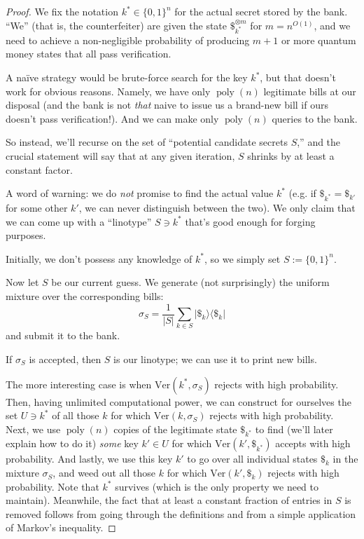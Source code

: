 \documentclass[12pt]{report}
\theoremstyle{plain}
\theoremstyle{definition}
\newcommand{\poly}{\operatorname{poly}}
\newcommand{\ketbra}[2]{|#1\rangle\!\langle#2|}
\newcommand{\proj}[1]{\ketbra{#1}{#1}}
\begin{document}
\begin{proof}
We fix the notation $k^\ast\in\{0,1\}^n$ for the actual secret stored by the bank.  ``We'' (that is, the counterfeiter) are given the state $\$_{k^\ast}^{\otimes m}$ for $m=n^{O(1)}$, and we need to achieve a non-negligible probability of producing $m+1$ or more quantum money states that all pass verification.

A na\"{i}ve strategy would be brute-force search for the key $k^\ast$, but that doesn't work for obvious reasons.  Namely, we have only $\poly(n)$ legitimate bills at our disposal (and the bank is not {\em that} naive to issue us a brand-new bill if ours doesn't pass verification!). And we can make only $\poly(n)$ queries to the bank.

So instead, we'll recurse on the set of ``potential candidate secrets $S$,'' and the crucial statement will say that at any given iteration, $S$ shrinks by at least a constant factor.

A word of warning: we do {\em not} promise to find the actual value $k^\ast$ (e.g. if $\$_{k^\ast}=\$_{k'}$ for some other $k'$, we can never distinguish between the two). We only claim that we can come up with a ``linotype'' $S\ni k^\ast$ that's good enough for forging purposes.

Initially, we don't possess any knowledge of $k^\ast$, so we simply set $S:=\{0,1\}^n$.

Now let $S$ be our current guess.  We generate (not surprisingly) the uniform mixture over the corresponding bills:
$$
\sigma_S = \frac 1{|S|} \sum_{k\in S} \proj{\$_k}
$$
and submit it to the bank.

If $\sigma_S$ is accepted, then $S$ is our linotype; we can use it to print new bills.

The more interesting case is when $\mathrm{Ver}(k^\ast,\sigma_S)$ rejects with high probability. Then, having unlimited computational power, we can construct for ourselves the set $U\ni k^\ast$ of all those $k$ for which $\mathrm{Ver}(k,\sigma_S)$ rejects with high probability. Next, we use $\poly(n)$ copies of the legitimate state $\$_{k^\ast}$ to find (we'll later explain how to do it) {\em some} key $k'\in U$ for which $\mathrm{Ver}(k',\$_{k^\ast})$ accepts with high probability.  And lastly, we use this key $k'$ to go over all individual states $\$_k$ in the mixture $\sigma_S$, and weed out all those $k$ for which $\mathrm{Ver}(k',\$_k)$ rejects with high probability. Note that $k^\ast$ survives (which is the only property we need to maintain).  Meanwhile, the fact that at least a constant fraction of entries in $S$ is removed follows from going through the definitions and from a simple application of Markov's inequality.


\end{proof}
\end{document}
